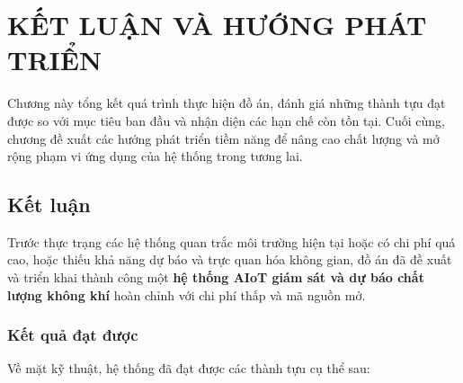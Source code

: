 \chapter{KẾT LUẬN VÀ HƯỚNG PHÁT TRIỂN}
\label{chap:conclusion}

Chương này tổng kết quá trình thực hiện đồ án, đánh giá những thành
tựu đạt được so với mục tiêu ban đầu và nhận diện các hạn chế còn
tồn tại. Cuối cùng, chương đề xuất các hướng phát triển tiềm năng
để nâng cao chất lượng và mở rộng phạm vi ứng dụng của hệ thống
trong tương lai.

\section{Kết luận}
\label{sec:conclusion:summary}

Trước thực trạng các hệ thống quan trắc môi trường hiện tại hoặc có
chi phí quá cao, hoặc thiếu khả năng dự báo và trực quan hóa không
gian, đồ án đã đề xuất và triển khai thành công một \textbf{hệ thống
AIoT giám sát và dự báo chất lượng không khí} hoàn chỉnh với chi phí
thấp và mã nguồn mở.

\subsection{Kết quả đạt được}
\label{subsec:conclusion:result}

Về mặt kỹ thuật, hệ thống đã đạt được các thành tựu cụ thể sau:

